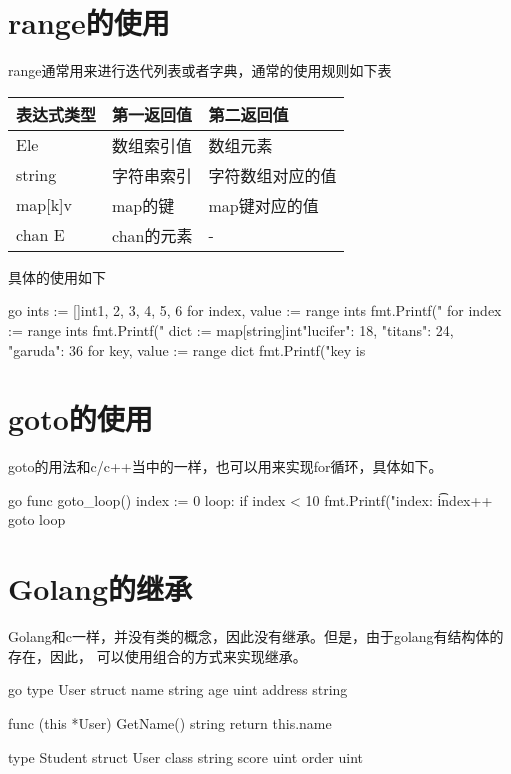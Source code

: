 \section{range的使用}
range通常用来进行迭代列表或者字典，通常的使用规则如下表
\begin{center}
  \begin{tabularx}{\textwidth}{|X|X|X|}
  \hline
  表达式类型& 第一返回值& 第二返回值\\ \hline
  [n]Ele& 数组索引值& 数组元素 \\
  string& 字符串索引& 字符数组对应的值\\
  map[k]v& map的键 & map键对应的值\\
  chan E & chan的元素 & - \\ \hline
  \end{tabularx}
  \label{tab:usage_of_range}
\end{center}

具体的使用如下
\begin{code-block}{go}
ints := []int{1, 2, 3, 4, 5, 6}
for index, value := range ints {
    fmt.Printf("%
}
for index := range ints {
    fmt.Printf("%
}
dict := map[string]int{"lucifer": 18, "titans": 24, "garuda": 36}
for key, value := range dict {
    fmt.Printf("key is %
}
\end{code-block}

\section{goto的使用}
goto的用法和c/c++当中的一样，也可以用来实现for循环，具体如下。
\begin{code-block}{go}
func goto_loop() {
    index := 0
loop:
    if index < 10 {
        fmt.Printf("index: \t%
        index++
        goto loop
    }
}
\end{code-block}

\section{Golang的继承}
Golang和c一样，并没有类的概念，因此没有继承。但是，由于golang有结构体的存在，因此，
可以使用组合的方式来实现继承。
\begin{code-block}{go}
type User struct{
    name string
    age uint
    address string
}

func (this *User) GetName() string{
    return this.name
}

type Student struct{
    User
    class string
    score uint
    order uint
}
\end{code-block}

